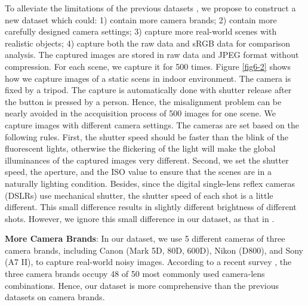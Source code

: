 To alleviate the limitations of the previous datasets \cite{RENOIR2014,crosschannel2016,dnd2017}, we propose to construct a new dataset which could: 1) contain more camera brands; 2) contain more carefully designed camera settings; 3) capture more real-world scenes with realistic objects; 4) capture both the raw data and sRGB data for comparison analysis. The captured images are stored in raw data and JPEG format without compression. For each scene, we capture it for 500 times. Figure \ref{fig6-2} shows how we capture images of a static scens in indoor environment. The camera is fixed by a tripod. The capture is automatically done with shutter release after the button is pressed by a person. Hence, the misalignment problem can be nearly avoided in the accquisition process of 500 images for one scene. We capture images with different camera settings. The cameras are set based on the following rules. First, the shutter speed should be faster than the blink of the fluorescent lights, otherwise the flickering of the light will make the global illuminances of the captured images very different. Second, we set the shutter speed, the aperture, and the ISO value to ensure that the scenes are in a naturally lighting condition. Besides, since the digital single-lens reflex cameras (DSLRs) use mechanical shutter, the shutter speed of each shot is a little different. This small difference results in slightly different brightness of different shots. However, we ignore this small difference in our dataset, as that in \cite{crosschannel2016}.


\textbf{More Camera Brands}: In our dataset, we use 5 different cameras of three camera brands, including Canon (Mark 5D, 80D, 600D), Nikon (D800), and Sony (A7 II), to capture real-world noisy images. According to a recent survey \cite{commoncamera}, the three camera brands occupy 48 of 50 most commonly used camera-lens combinations. Hence, our dataset is more comprehensive than the previous datasets on camera brands.


